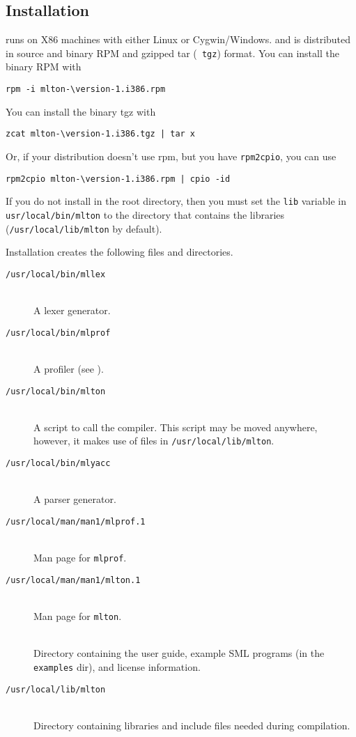 
\subsection{Installation}

{\mlton} runs on X86 machines with either Linux or Cygwin/Windows.
and is distributed in source and binary RPM and gzipped tar ({\tt
tgz}) format.  You can install the binary RPM with
\begin{verbatim}
rpm -i mlton-\version-1.i386.rpm
\end{verbatim}
You can install the binary tgz with
\begin{verbatim}
zcat mlton-\version-1.i386.tgz | tar x
\end{verbatim}
Or, if your distribution doesn't use rpm, but you have {\tt rpm2cpio},
you can use
\begin{verbatim}
rpm2cpio mlton-\version-1.i386.rpm | cpio -id
\end{verbatim}

If you do not install {\mlton} in the root directory, then you must
set the {\tt lib} variable in {\tt usr/local/bin/mlton} to the
directory that contains the libraries ({\tt /usr/local/lib/mlton} by
default).

Installation creates the following files and directories.

\newcommand{\place}[1]{\item[\tt #1]\hspace{1in}\\}

\begin{description}

\place{/usr/local/bin/mllex}
A lexer generator.

\place{/usr/local/bin/mlprof}
A profiler (see ).

\place{/usr/local/bin/mlton}
A script to call the compiler.
This script may be moved anywhere, however,
it makes use of files in {\tt /usr/local/lib/mlton}.

\place{/usr/local/bin/mlyacc}
A parser generator.

\place{/usr/local/man/man1/mlprof.1}
Man page for {\tt mlprof}.

\place{/usr/local/man/man1/mlton.1}
Man page for {\tt mlton}.

\place{\doc}
Directory containing the user guide, example SML programs (in the {\tt examples}
dir), and license information.

\place{/usr/local/lib/mlton}
Directory containing libraries and include files needed during
compilation.

\end{description}

